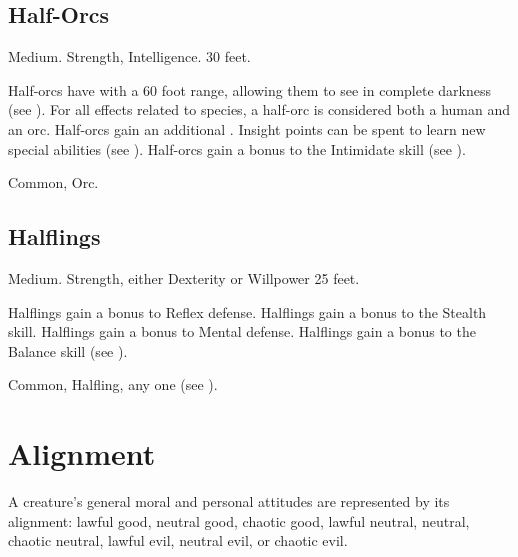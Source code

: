     \subsection{Half-Orcs}
         Medium.
          Strength,  Intelligence.
         30 feet.
        \begin{raggeditemize}
             Half-orcs have  with a 60 foot range, allowing them to see in complete darkness (see ).
             For all effects related to species, a half-orc is considered both a human and an orc.
             Half-orcs gain an additional .
                Insight points can be spent to learn new special abilities (see ).
             Half-orcs gain a  bonus to the Intimidate skill (see ).
        \end{raggeditemize}
         Common, Orc.

    \subsection{Halflings}
         Medium.
          Strength, either  Dexterity or  Willpower
         25 feet.
        \begin{raggeditemize}
             Halflings gain a  bonus to Reflex defense.
             Halflings gain a  bonus to the Stealth skill.
             Halflings gain a  bonus to Mental defense.
             Halflings gain a  bonus to the Balance skill (see ).
        \end{raggeditemize}
         Common, Halfling, any one  (see ).

\section{Alignment}\label{Alignment}
    A creature's general moral and personal attitudes are represented by its alignment: lawful good, neutral good, chaotic good, lawful neutral, neutral, chaotic neutral, lawful evil, neutral evil, or chaotic evil.


